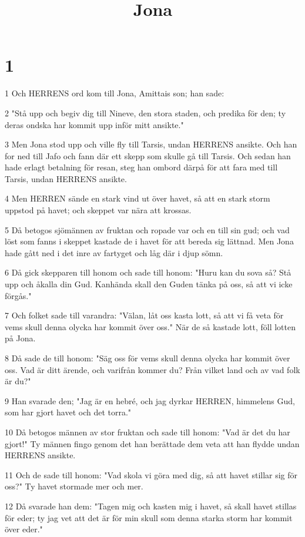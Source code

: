 

\title{Jona}


\chapter{1}

\par 1 Och HERRENS ord kom till Jona, Amittais son; han sade:
\par 2 "Stå upp och begiv dig till Nineve, den stora staden, och predika för den; ty deras ondska har kommit upp inför mitt ansikte."
\par 3 Men Jona stod upp och ville fly till Tarsis, undan HERRENS ansikte. Och han for ned till Jafo och fann där ett skepp som skulle gå till Tarsis. Och sedan han hade erlagt betalning för resan, steg han ombord därpå för att fara med till Tarsis, undan HERRENS ansikte.
\par 4 Men HERREN sände en stark vind ut över havet, så att en stark storm uppstod på havet; och skeppet var nära att krossas.
\par 5 Då betogos sjömännen av fruktan och ropade var och en till sin gud; och vad löst som fanns i skeppet kastade de i havet för att bereda sig lättnad. Men Jona hade gått ned i det inre av fartyget och låg där i djup sömn.
\par 6 Då gick skepparen till honom och sade till honom: "Huru kan du sova så? Stå upp och åkalla din Gud. Kanhända skall den Guden tänka på oss, så att vi icke förgås."
\par 7 Och folket sade till varandra: "Välan, låt oss kasta lott, så att vi få veta för vems skull denna olycka har kommit över oss." När de så kastade lott, föll lotten på Jona.
\par 8 Då sade de till honom: "Säg oss för vems skull denna olycka har kommit över oss. Vad är ditt ärende, och varifrån kommer du? Från vilket land och av vad folk är du?"
\par 9 Han svarade den; "Jag är en hebré, och jag dyrkar HERREN, himmelens Gud, som har gjort havet och det torra."
\par 10 Då betogos männen av stor fruktan och sade till honom: "Vad är det du har gjort!" Ty männen fingo genom det han berättade dem veta att han flydde undan HERRENS ansikte.
\par 11 Och de sade till honom: "Vad skola vi göra med dig, så att havet stillar sig för oss?" Ty havet stormade mer och mer.
\par 12 Då svarade han dem: "Tagen mig och kasten mig i havet, så skall havet stillas för eder; ty jag vet att det är för min skull som denna starka storm har kommit över eder."
